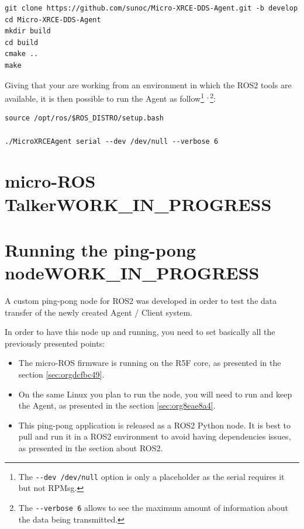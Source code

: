 \documentclass[10pt]{article}
\begin{document}
\begin{verbatim}
git clone https://github.com/sunoc/Micro-XRCE-DDS-Agent.git -b develop
cd Micro-XRCE-DDS-Agent
mkdir build
cd build
cmake ..
make
\end{verbatim}

Giving that your are working from an environment in which the ROS2 tools are available, it is then possible
to run the Agent as follow\footnote{The \texttt{-{}-{}dev /dev/null} option is only a placeholder as the serial requires it but not RPMsg.} \textsuperscript{,}\,\footnote{The \texttt{-{}-{}verbose 6} allows to see the maximum amount of information about the data being transmitted.}:

\begin{verbatim}
source /opt/ros/$ROS_DISTRO/setup.bash

./MicroXRCEAgent serial --dev /dev/null --verbose 6
\end{verbatim}


\clearpage
\section{micro-ROS Talker\hfill{}\textsc{WORK\_IN\_PROGRESS}}
\label{sec:orgb670f33}

\clearpage
\section{Running the ping-pong node\hfill{}\textsc{WORK\_IN\_PROGRESS}}
\label{sec:org2803009}
A custom ping-pong node for ROS2 was developed in order to test the data transfer of the newly created
Agent / Client system.

In order to have this node up and running, you need to set basically all the previously presented points:
\begin{itemize}
\item The micro-ROS firmware is running on the R5F core, as presented in the section \ref{sec:orgdcfbc49}.
\item On the same Linux you plan to run the node, you will need to run and keep the Agent, as presented
in the section \ref{sec:org8eae8a4}.
\item This ping-pong application is released as a ROS2 Python node. It is best to pull and run it
in a ROS2 environment to avoid having dependencies issues, as presented in the section about ROS2.

\clearpage
\end{itemize}
\end{document}
